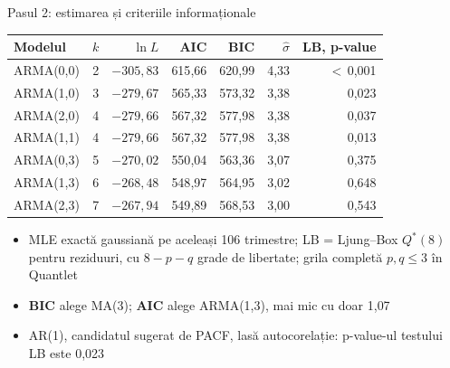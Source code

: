\begin{frame}{Pasul 2: estimarea și criteriile informaționale}
\itemsize{\footnotesize}
\begin{center}
\footnotesize
\begin{tabular}{lrrrrrr}
\toprule
\textbf{Modelul} & $k$ & $\ln L$ & \textbf{AIC} & \textbf{BIC} & $\hat\sigma$ & \textbf{LB, p-value} \\
\midrule
ARMA(0,0) & 2 & $\ensuremath{-}305{,}83$ & 615{,}66 & 620{,}99 & 4{,}33 & $<$\,0{,}001 \\
ARMA(1,0) & 3 & $\ensuremath{-}279{,}67$ & 565{,}33 & 573{,}32 & 3{,}38 & 0{,}023 \\
ARMA(2,0) & 4 & $\ensuremath{-}279{,}66$ & 567{,}32 & 577{,}98 & 3{,}38 & 0{,}037 \\
ARMA(1,1) & 4 & $\ensuremath{-}279{,}66$ & 567{,}32 & 577{,}98 & 3{,}38 & 0{,}013 \\
ARMA(0,3) & 5 & $\ensuremath{-}270{,}02$ & 550{,}04 & 563{,}36 & 3{,}07 & 0{,}375 \\
ARMA(1,3) & 6 & $\ensuremath{-}268{,}48$ & 548{,}97 & 564{,}95 & 3{,}02 & 0{,}648 \\
ARMA(2,3) & 7 & $\ensuremath{-}267{,}94$ & 549{,}89 & 568{,}53 & 3{,}00 & 0{,}543 \\
\bottomrule
\end{tabular}
\end{center}
\begin{itemize}
    \item MLE exactă gaussiană pe aceleași 106 trimestre; LB = Ljung--Box $Q^*(8)$ pentru reziduuri, cu $8 - p - q$ grade de libertate; grila completă $p, q \le 3$ în Quantlet
    \item \textbf{BIC} alege MA(3); \textbf{AIC} alege ARMA(1,3), mai mic cu doar 1{,}07
    \item AR(1), candidatul sugerat de PACF, lasă autocorelație: p-value-ul testului LB este 0{,}023
\end{itemize}
\end{frame}

